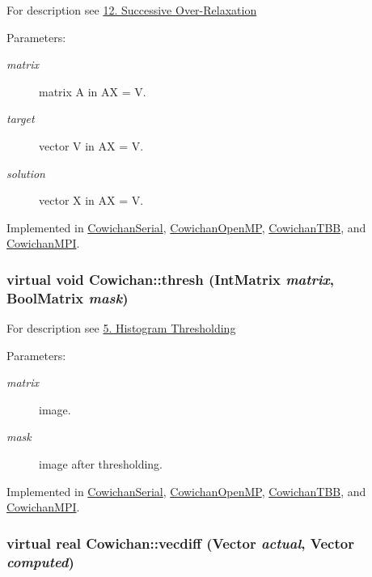 For description see \hyperlink{index_sor_sec}{12. Successive Over-Relaxation} \begin{Desc}
\item[Parameters:]
\begin{description}
\item[{\em matrix}]matrix A in AX = V. \item[{\em target}]vector V in AX = V. \item[{\em solution}]vector X in AX = V. \end{description}
\end{Desc}


Implemented in \hyperlink{class_cowichan_serial_6e8b06711d976de1adc1e4dc81e560e5}{CowichanSerial}, \hyperlink{class_cowichan_open_m_p_d6482d0369a26a51ef0e37ab238fc664}{CowichanOpenMP}, \hyperlink{class_cowichan_t_b_b_dbb32ce457d0edca6815ab1cb2459276}{CowichanTBB}, and \hyperlink{class_cowichan_m_p_i_7388c844e8aa73ab0923443a3a7ef069}{CowichanMPI}.\hypertarget{class_cowichan_a0b633b8c1f21884e0998a9c7020c08c}{
\subsubsection[{thresh}]{\setlength{\rightskip}{0pt plus 5cm}virtual void Cowichan::thresh ({\bf IntMatrix} {\em matrix}, \/  {\bf BoolMatrix} {\em mask})}}
\label{class_cowichan_a0b633b8c1f21884e0998a9c7020c08c}


For description see \hyperlink{index_thresh_sec}{5. Histogram Thresholding} \begin{Desc}
\item[Parameters:]
\begin{description}
\item[{\em matrix}]image. \item[{\em mask}]image after thresholding. \end{description}
\end{Desc}


Implemented in \hyperlink{class_cowichan_serial_7c0f93b2099ce919f91b5d953ff76511}{CowichanSerial}, \hyperlink{class_cowichan_open_m_p_e72c4c0a162f30eac37333bd28db97bc}{CowichanOpenMP}, \hyperlink{class_cowichan_t_b_b_3306d21f0b3d12cc2e3b050b99812a27}{CowichanTBB}, and \hyperlink{class_cowichan_m_p_i_49ff96b091a61e9cfd9aad8824e7fbbd}{CowichanMPI}.\hypertarget{class_cowichan_775d72b5e7d122f9f32555352278250e}{
\subsubsection[{vecdiff}]{\setlength{\rightskip}{0pt plus 5cm}virtual {\bf real} Cowichan::vecdiff ({\bf Vector} {\em actual}, \/  {\bf Vector} {\em computed})}}
\label{class_cowichan_775d72b5e7d122f9f32555352278250e}


